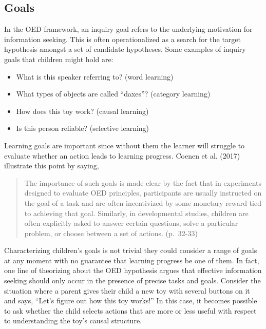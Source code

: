\documentclass[oneside]{report}
\begin{document}
\subsection{Goals}\label{goals}

In the OED framework, an inquiry goal refers to the underlying
motivation for information seeking. This is often operationalized as a
search for the target hypothesis amongst a set of candidate hypotheses.
Some examples of inquiry goals that children might hold are:
\begin{itemize}
\tightlist
\item
  What is this speaker referring to? (word learning)
\item
  What types of objects are called ``daxes''? (category learning)
\item
  How does this toy work? (causal learning)
\item
  Is this person reliable? (selective learning)
\end{itemize}
\noindent
Learning goals are important since without them the learner will
struggle to evaluate whether an action leads to learning progress.
Coenen et al. (2017) illustrate this point by saying,
\begin{quote}
The importance of such goals is made clear by the fact that in
experiments designed to evaluate OED principles, participants are
usually instructed on the goal of a task and are often incentivized by
some monetary reward tied to achieving that goal. Similarly, in
developmental studies, children are often explicitly asked to answer
certain questions, solve a particular problem, or choose between a set
of actions. (p.~32-33)
\end{quote}
\noindent
Characterizing children's goals is not trivial they could consider a
range of goals at any moment with no guarantee that learning progress be
one of them. In fact, one line of theorizing about the OED hypothesis
argues that effective information seeking should only occur in the
presence of precise tasks and goals. Consider the situation where a
parent gives their child a new toy with several buttons on it and says,
``Let's figure out how this toy works!'' In this case, it becomes
possible to ask whether the child selects actions that are more or less
useful with respect to understanding the toy's causal structure.
\end{document}

